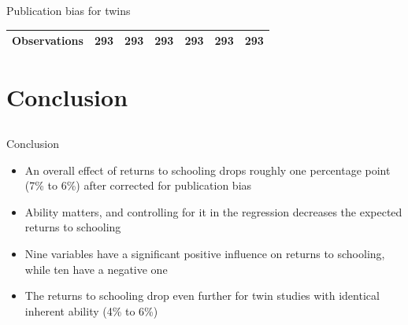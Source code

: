 \documentclass{beamer} %
\begin{document}
\begin{frame}{Publication bias for twins}
\begin{tiny}
\begin{table}[!htbp]
\begin{tabular}{
                    @{}
                    l*{6}{c}}
                \midrule
                \addlinespace[0.5em]
                Observations                          & 293     & 293     & 293     & 293     & 293     & 293     \\

                \bottomrule
            \end{tabular}
        \end{table}

    \end{tiny}
\end{frame}


\section{Conclusion}
\subsection{}


\begin{frame}{Conclusion}
    \begin{itemize}
        \item<1-> An overall effect of returns to schooling drops roughly one percentage point (7\% to 6\%) after corrected for publication bias
        \item<2-> Ability matters, and controlling for it in the regression decreases the expected returns to schooling
        \item<3-> Nine variables have a significant positive influence on returns to schooling, while ten have a negative one
        \item<4-> The returns to schooling drop even further for twin studies with identical inherent ability (4\% to 6\%)
    \end{itemize}
\end{frame}



\end{document}
